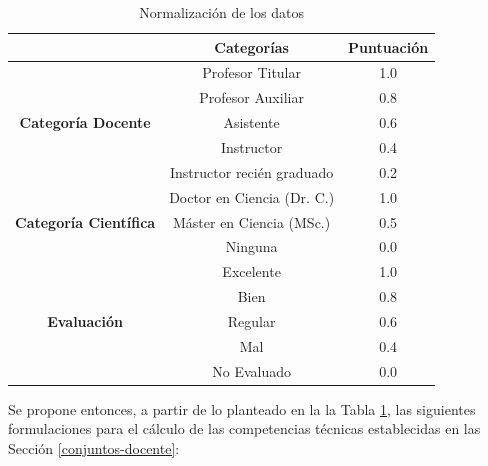 \begin{table} [H]
	\centering
	\caption{Normalización de los datos} \label{norm-datos-carga}
	\begin{tabular}{|c|c|c|}
		\cline{2-3}
		             \multicolumn{1}{c|}{}               &    \textbf{Categorías}     & \textbf{Puntuación} \\ \hline
		 \multirow{5}{3cm}{\textbf{Categoría Docente}}   &      Profesor Titular      &         1.0         \\ \cline{2-3}
		                                                 &     Profesor Auxiliar      &         0.8         \\ \cline{2-3}
		                                                 &         Asistente          &         0.6         \\ \cline{2-3}
		                                                 &         Instructor         &         0.4         \\ \cline{2-3}
		                                                 & Instructor recién graduado &         0.2         \\ \hline\hline
		\multirow{3}{3cm}{\textbf{Categoría Científica}} &  Doctor en Ciencia (Dr. C.)  &         1.0         \\ \cline{2-3}
		                                                 & Máster en Ciencia (MSc.)  &         0.5         \\ \cline{2-3}
		                                                 &          Ninguna           &         0.0         \\ \hline\hline
		     \multirow{5}{3cm}{\textbf{Evaluación}}      &         Excelente          &         1.0         \\ \cline{2-3}
		                                                 &            Bien            &         0.8         \\ \cline{2-3}
		                                                 &          Regular           &         0.6         \\ \cline{2-3}
		                                                 &            Mal             &         0.4         \\ \cline{2-3}
		                                                 &       No Evaluado        &         0.0         \\ \hline
	\end{tabular}
\end{table}

Se propone entonces, a partir de lo planteado en la la Tabla \ref{norm-datos-carga}, las siguientes formulaciones para el cálculo de las competencias técnicas establecidas en las Sección \ref{conjuntos-docente}:

